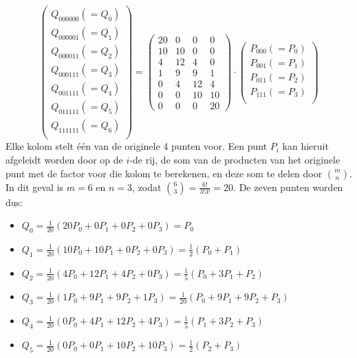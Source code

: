 \documentclass{report}
\begin{document}
\begin{itemize}
{\begin{itemize}
			$$
			\begin{pmatrix}
				Q_{000000} (=Q_0) \\
				Q_{000001} (=Q_1)\\
				Q_{000011} (=Q_2)\\
				Q_{000111} (=Q_3)\\
				Q_{001111} (=Q_4)\\
				Q_{011111} (=Q_5)\\
				Q_{111111} (=Q_6)\\
			\end{pmatrix}
			= 
			\begin{pmatrix}
				20 & 0  & 0  & 0  \\ 
				10 & 10 & 0  & 0  \\ 
				4  & 12 & 4  & 0  \\ 
				1  & 9  & 9  & 1  \\ 
				0  & 4  & 12 & 4  \\ 
				0  & 0  & 10 & 10 \\ 
				0  & 0  & 0  & 20 
			\end{pmatrix}
			\cdot 
			\begin{pmatrix}
				P_{000} (=P_0)\\
				P_{001} (=P_1)\\
				P_{011} (=P_2)\\
				P_{111} (=P_3)\\
			\end{pmatrix}
			$$
			Elke kolom stelt één van de originele 4 punten voor. Een punt $P_i$ kan hieruit afgeleidt worden door op de $i$-de rij, de som van 
			de producten van het originele punt met de factor voor die kolom te berekenen, en deze som te delen door $\binom{m}{n}$. In dit geval is $m = 6$ en $n = 3$, zodat $\binom{6}{3} = \frac{6!}{3! 3!} = 20$. De zeven punten worden dus:
			\begin{itemize}
				\item $Q_0 = \frac{1}{20} (20P_0 + 0P_1  + 0P_2  + 0P_3) = P_0$
				\item $Q_1 = \frac{1}{20}(10P_0 + 10P_1 + 0P_2  + 0P_3) = \frac{1}{2}(P_0 + P_1)$ 
				\item $Q_2 = \frac{1}{20}(4P_0  + 12P_1 + 4P_2  + 0P_3) = \frac{1}{5}(P_0  + 3P_1 + P_2)$
				\item $Q_3 = \frac{1}{20}(1P_0  + 9P_1 + 9P_2  + 1P_3) = \frac{1}{20}(P_0 + 9P_1  + 9P_2 + P_3)$
				\item $Q_4 = \frac{1}{20}(0P_0  + 4P_1 + 12P_2  + 4P_3) = \frac{1}{5}(P_1  + 3P_2 + P_3)$
				\item $Q_5 = \frac{1}{20}(0P_0  + 0P_1 + 10P_2  + 10P_3) = \frac{1}{2}(P_2 + P_3)$

\end{itemize}
\end{itemize}}
\end{itemize}
\end{document}
